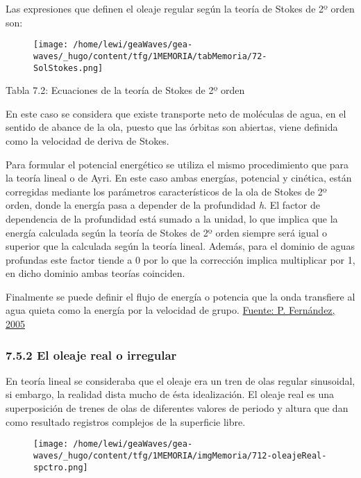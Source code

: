 Las expresiones que definen el oleaje regular según la teoría de Stokes
de 2º orden son:

\begin{figure}
\centering
\texttt{[image: /home/lewi/geaWaves/gea-waves/\_hugo/content/tfg/1MEMORIA/tabMemoria/72-SolStokes.png]}
\caption{}
\end{figure}

Tabla 7.2: Ecuaciones de la teoría de Stokes de 2º orden

En este caso se considera que existe transporte neto de moléculas de
agua, en el sentido de abance de la ola, puesto que las órbitas son
abiertas, viene definida como la velocidad de deriva de Stokes.

Para formular el potencial energético se utiliza el mismo procedimiento
que para la teoría lineal o de Ayri. En este caso ambas energías,
potencial y cinética, están corregidas mediante los parámetros
característicos de la ola de Stokes de 2º orden, donde la energía pasa a
depender de la profundidad \emph{h}. El factor de dependencia de la
profundidad está sumado a la unidad, lo que implica que la energía
calculada según la teoría de Stokes de 2º orden siempre será igual o
superior que la calculada según la teoría lineal. Además, para el
dominio de aguas profundas este factor tiende a 0 por lo que la
corrección implica multiplicar por 1, en dicho dominio ambas teorías
coinciden.

Finalmente se puede definir el flujo de energía o potencia que la onda
transfiere al agua quieta como la energía por la velocidad de grupo.
\href{http://files.pfernandezdiez.es/EnergiasAlternativas/mar/PDFs/01Olas.pdf}{Fuente:
P. Fernández, 2005}

\subsubsection{7.5.2 El oleaje real o irregular}\label{header-n286}

En teoría lineal se consideraba que el oleaje era un tren de olas
regular sinusoidal, si embargo, la realidad dista mucho de ésta
idealización. El oleaje real es una superposición de trenes de olas de
diferentes valores de periodo y altura que dan como resultado registros
complejos de la superficie libre.

\begin{figure}
\centering
\texttt{[image: /home/lewi/geaWaves/gea-waves/\_hugo/content/tfg/1MEMORIA/imgMemoria/712-oleajeReal-spctro.png]}
\caption{}
\end{figure}

